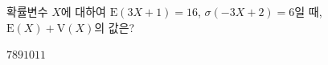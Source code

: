 확률변수 $X$에 대하여 $\mathrm{E}(3X+1)=16$, $\sigma(-3X+2)=6$일 때, $\mathrm{E}(X)+\mathrm{V}(X)$의 값은?
\begin{choices32}{$7$}{$8$}{$9$}{$10$}{$11$}\end{choices32}
